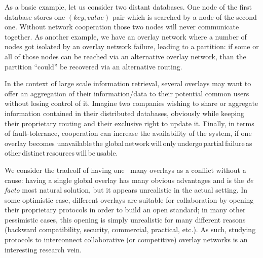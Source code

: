 As a basic example, let us consider two distant databases. One node of
the first database stores one $(key, value)$ pair which is searched by
a node of the second one. Without network cooperation those two nodes
will never communicate together.  As another example, we have an
overlay network where a number of nodes got isolated by an overlay
network failure, leading to a partition: if some or all of those nodes
can be reached via an alternative overlay network, than the partition
``could'' be recovered via an alternative routing.

In the context of large scale information retrieval, several overlays
may want to offer an aggregation of their information/data to their
potential common users without losing control of it. Imagine two
companies wishing to share or aggregate information contained in their
distributed databases, obviously while keeping their proprietary
routing and their exclusive right to update it.  Finally, in terms of
fault-tolerance, cooperation can increase the availability of the
system, if one overlay becomes unavailable\,the
global\,network\,will\,only\,undergo\,partial\,failure\,as\,other\,distinct\,resources\,will\,be\,usable.

We consider the tradeoff of having one \vs\ many overlays as a
conflict without a cause: having a single global overlay has many
obvious advantages and is the \textit{de facto} most natural solution,
but it appears unrealistic in the actual setting. In some optimistic
case, different overlays are suitable for collaboration by opening
their proprietary protocols in order to build an open standard; in
many other pessimistic cases, this opening is simply unrealistic for
many different reasons (backward compatibility, security, commercial,
practical, etc.). As such, studying protocols to interconnect
collaborative (or competitive) overlay networks is an interesting
research vein.%



